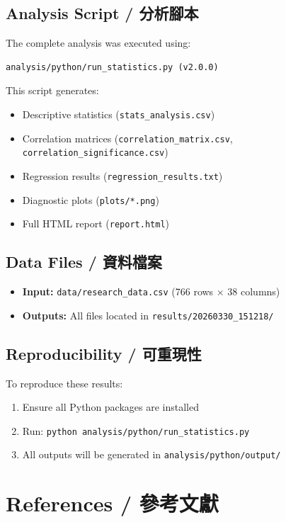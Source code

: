 \documentclass[12pt,a4paper,fontset=none]{ctexart}
\begin{document}
\subsection{Analysis Script / 分析腳本}

The complete analysis was executed using:
\begin{verbatim}
analysis/python/run_statistics.py (v2.0.0)
\end{verbatim}

This script generates:
\begin{itemize}
    \item Descriptive statistics (\texttt{stats\_analysis.csv})
    \item Correlation matrices (\texttt{correlation\_matrix.csv}, \texttt{correlation\_significance.csv})
    \item Regression results (\texttt{regression\_results.txt})
    \item Diagnostic plots (\texttt{plots/*.png})
    \item Full HTML report (\texttt{report.html})
\end{itemize}

\subsection{Data Files / 資料檔案}

\begin{itemize}
    \item \textbf{Input:} \texttt{data/research\_data.csv} (766 rows × 38 columns)
    \item \textbf{Outputs:} All files located in \texttt{results/20260330\_151218/}
\end{itemize}

\subsection{Reproducibility / 可重現性}

To reproduce these results:
\begin{enumerate}
    \item Ensure all Python packages are installed
    \item Run: \texttt{python analysis/python/run\_statistics.py}
    \item All outputs will be generated in \texttt{analysis/python/output/}
\end{enumerate}

\section{References / 參考文獻}
\end{document}
